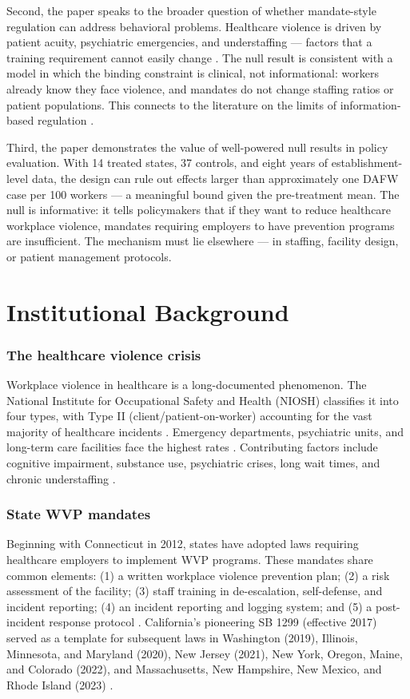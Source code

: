 \documentclass[12pt]{article}
\begin{document}
Second, the paper speaks to the broader question of whether mandate-style regulation can address behavioral problems. Healthcare violence is driven by patient acuity, psychiatric emergencies, and understaffing --- factors that a training requirement cannot easily change \citep{arnetz2015, pompeii2013}. The null result is consistent with a model in which the binding constraint is clinical, not informational: workers already know they face violence, and mandates do not change staffing ratios or patient populations. This connects to the literature on the limits of information-based regulation \citep{jin2003, dranove2003}.

Third, the paper demonstrates the value of well-powered null results in policy evaluation. With 14 treated states, 37 controls, and eight years of establishment-level data, the design can rule out effects larger than approximately one DAFW case per 100 workers --- a meaningful bound given the pre-treatment mean. The null is informative: it tells policymakers that if they want to reduce healthcare workplace violence, mandates requiring employers to have prevention programs are insufficient. The mechanism must lie elsewhere --- in staffing, facility design, or patient management protocols.

\section{Institutional Background}

\subsubsection*{The healthcare violence crisis} Workplace violence in healthcare is a long-documented phenomenon. The National Institute for Occupational Safety and Health (NIOSH) classifies it into four types, with Type II (client/patient-on-worker) accounting for the vast majority of healthcare incidents \citep{niosh2002}. Emergency departments, psychiatric units, and long-term care facilities face the highest rates \citep{phillips2016}. Contributing factors include cognitive impairment, substance use, psychiatric crises, long wait times, and chronic understaffing \citep{pompeii2013}.

\subsubsection*{State WVP mandates} Beginning with Connecticut in 2012, states have adopted laws requiring healthcare employers to implement WVP programs. These mandates share common elements: (1) a written workplace violence prevention plan; (2) a risk assessment of the facility; (3) staff training in de-escalation, self-defense, and incident reporting; (4) an incident reporting and logging system; and (5) a post-incident response protocol \citep{healthaffairs2024}. California's pioneering SB 1299 (effective 2017) served as a template for subsequent laws in Washington (2019), Illinois, Minnesota, and Maryland (2020), New Jersey (2021), New York, Oregon, Maine, and Colorado (2022), and Massachusetts, New Hampshire, New Mexico, and Rhode Island (2023) \citep{osha2024}.
\end{document}
